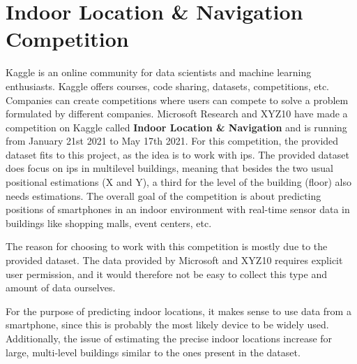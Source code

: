 \section{Indoor Location \& Navigation Competition}
\label{sec:kaggleComp}
Kaggle is an online community for data scientists and machine learning enthusiasts. Kaggle offers courses, code sharing, datasets, competitions, etc. Companies can create competitions where users can compete to solve a problem formulated by different companies. Microsoft Research and XYZ10 have made a competition on Kaggle called \textbf{Indoor Location \& Navigation} and is running from January 21st 2021 to May 17th 2021. For this competition, the provided dataset fits to this project, as the idea is to work with \gls{ips}. The provided dataset does focus on \gls{ips} in multilevel buildings, meaning that besides the two usual positional estimations (X and Y), a third for the level of the building (floor) also needs estimations. The overall goal of the competition is about predicting positions of smartphones in an indoor environment with real-time sensor data in buildings like shopping malls, event centers, etc.

The reason for choosing to work with this competition is mostly due to the provided dataset. The data provided by Microsoft and XYZ10 requires explicit user permission\cite{CompetitionSite}, and it would therefore not be easy to collect this type and amount of data ourselves.

For the purpose of predicting indoor locations, it makes sense to use data from a smartphone, since this is probably the most likely device to be widely used. Additionally, the issue of estimating the precise indoor locations increase for large, multi-level buildings similar to the ones present in the dataset.

